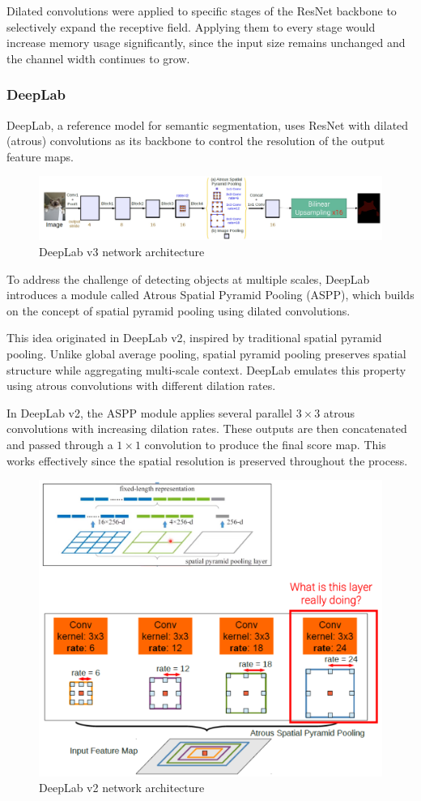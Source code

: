 Dilated convolutions were applied to specific stages of the ResNet backbone to selectively expand the receptive field. Applying them to every stage would increase memory usage significantly, since the input size remains unchanged and the channel width continues to grow.

\subsubsection{DeepLab}

DeepLab, a reference model for semantic segmentation, uses ResNet with dilated (atrous) convolutions as its backbone to control the resolution of the output feature maps.

\begin{figure}[htbp]
  \centering
  \includegraphics[width=0.9\linewidth]{./img/deeplab.jpg}
  \caption{DeepLab v3 network architecture}
\end{figure}

To address the challenge of detecting objects at multiple scales, DeepLab introduces a module called Atrous Spatial Pyramid Pooling (ASPP), which builds on the concept of spatial pyramid pooling using dilated convolutions.

This idea originated in DeepLab v2, inspired by traditional spatial pyramid pooling. Unlike global average pooling, spatial pyramid pooling preserves spatial structure while aggregating multi-scale context. DeepLab emulates this property using atrous convolutions with different dilation rates.

In DeepLab v2, the ASPP module applies several parallel $3 \times 3$ atrous convolutions with increasing dilation rates. These outputs are then concatenated and passed through a $1 \times 1$ convolution to produce the final score map. This works effectively since the spatial resolution is preserved throughout the process.

\begin{figure}[htbp]
  \centering
  \includegraphics[width=0.5\linewidth]{./img/deeplab_v2.png}
  \caption{DeepLab v2 network architecture}
\end{figure}

